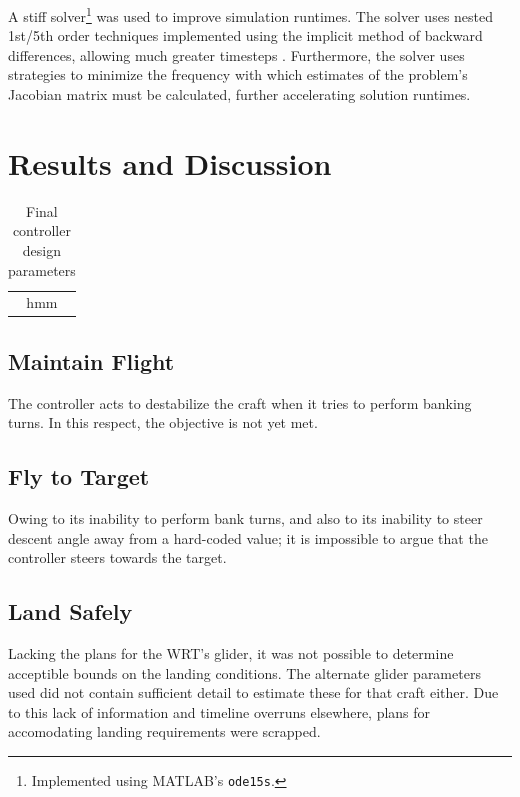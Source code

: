 \documentclass{sydeStyle}
\begin{document}
A stiff solver\footnote{Implemented using MATLAB's \texttt{ode15s}.} was used to
improve simulation runtimes.  The solver uses nested 1st/5th order techniques
implemented using the implicit method of backward differences, allowing much
greater timesteps \cite{SR97}.  Furthermore, the solver uses strategies to
minimize the frequency with which estimates of the problem's Jacobian matrix
must be calculated, further accelerating solution runtimes.

\chapter{Results and Discussion}
\label{sec:results}

\begin{table}
    \centering
    \begin{tabular}{|c|}
        hmm
    \end{tabular}
    \caption{Final controller design parameters}
    \label{tab:ctrlparams}
\end{table}

\section{Maintain Flight}

The controller acts to destabilize the craft when it tries to perform banking
turns. In this respect, the objective is not yet met.

\section{Fly to Target}

Owing to its inability to perform bank turns, and also to its inability to steer
descent angle away from a hard-coded value; it is impossible to argue that the
controller steers towards the target.

\section{Land Safely}

Lacking the plans for the WRT's glider, it was not possible to determine
acceptible bounds on the landing conditions. The alternate glider parameters
used did not contain sufficient detail to estimate these for that craft either.
Due to this lack of information and timeline overruns elsewhere, plans for
accomodating landing requirements were scrapped.
\end{document}
